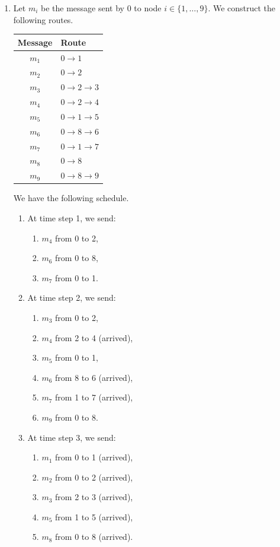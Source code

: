 \begin{parts}
\begin{solution}
\begin{enumerate}
      \item Let $m_i$ be the message sent by $0$ to node $i \in \{1, \ldots, 9\}$. We construct the following routes.
      \begin{center}
        \begin{tabular}{cl}
          \toprule
          Message & Route \\
          \midrule
          $m_1$ & $0 \to 1$ \\
          $m_2$ & $0 \to 2$ \\
          $m_3$ & $0 \to 2 \to 3$ \\
          $m_4$ & $0 \to 2 \to 4$ \\
          $m_5$ & $0 \to 1 \to 5$ \\
          $m_6$ & $0 \to 8 \to 6$ \\
          $m_7$ & $0 \to 1 \to 7$ \\
          $m_8$ & $0 \to 8$ \\
          $m_9$ & $0 \to 8 \to 9$ \\
          \bottomrule
        \end{tabular}
      \end{center}
      We have the following schedule.
      \begin{enumerate}
        \item At time step 1, we send:
        \begin{enumerate}
          \item $m_4$ from 0 to 2,
          \item $m_6$ from 0 to 8,
          \item $m_7$ from 0 to 1.
        \end{enumerate}
        \item At time step 2, we send:
        \begin{enumerate}
          \item $m_3$ from 0 to 2,
          \item $m_4$ from 2 to 4 (arrived),
          \item $m_5$ from 0 to 1,
          \item $m_6$ from 8 to 6 (arrived),
          \item $m_7$ from 1 to 7 (arrived),
          \item $m_9$ from 0 to 8.
        \end{enumerate}
        \item At time step 3, we send:
        \begin{enumerate}
          \item $m_1$ from 0 to 1 (arrived),
          \item $m_2$ from 0 to 2 (arrived),
          \item $m_3$ from 2 to 3 (arrived),
          \item $m_5$ from 1 to 5 (arrived),
          \item $m_8$ from 0 to 8 (arrived). 
        \end{enumerate}
      \end{enumerate}
    \end{enumerate}
  \end{solution}


\end{parts}
